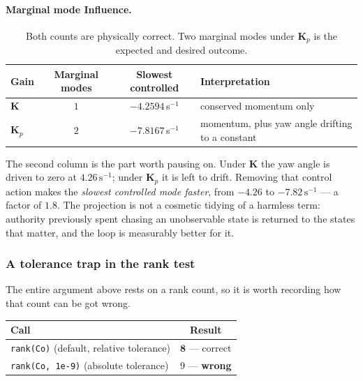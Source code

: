 \paragraph{Marginal mode Influence.}

\begin{table}[htbp]
\centering
\small
\begin{tabular}{@{}lccl@{}}
\toprule
\textbf{Gain} & \textbf{Marginal modes} & \textbf{Slowest controlled}
& \textbf{Interpretation}\\
\midrule
$\bm{K}$   & $1$ & $-4.2594$\,s$^{-1}$ & conserved momentum only\\
$\bm{K}_p$ & $2$ & $\bm{-7.8167}$\,s$^{-1}$
  & momentum, plus yaw angle drifting to a constant\\
\bottomrule
\end{tabular}
\caption{Both counts are physically correct. Two marginal modes under
$\bm{K}_p$ is the expected and desired outcome.}
\label{tab:marginal-modes}
\end{table}

The second column is the part worth pausing on. Under $\bm{K}$ the yaw angle
is driven to zero at $4.26\,\mathrm{s^{-1}}$; under $\bm{K}_p$ it is left to
drift. Removing that control action makes the \emph{slowest controlled mode
faster}, from $-4.26$ to $-7.82\,\mathrm{s^{-1}}$ --- a factor of $1.8$. The
projection is not a cosmetic tidying of a harmless term: authority previously
spent chasing an unobservable state is returned to the states that matter,
and the loop is measurably better for it.

\subsubsection{A tolerance trap in the rank test}
\label{sec:rank-trap}

The entire argument above rests on a rank count, so it is worth recording how
that count can be got wrong.

\begin{table}[htbp]
\centering
\small
\begin{tabular}{@{}lc@{}}
\toprule
\textbf{Call} & \textbf{Result}\\
\midrule
\texttt{rank(Co)} \quad (default, relative tolerance) & $\bm{8}$ --- correct\\
\texttt{rank(Co, 1e-9)} \quad (absolute tolerance) & $9$ --- \textbf{wrong}\\
\bottomrule
\end{tabular}
\end{table}

